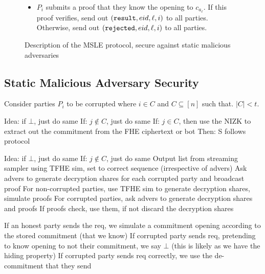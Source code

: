 \begin{figure}
{\begin{minipage}{1\textwidth}
\begin{itemize}
\begin{itemize}
					      \item $P_i$ submits a proof that they know the opening to $c_{a_\ell}$.
					            If this proof verifies, send out $(\texttt{result}, {eid}, \ell, i)$ to all parties.
					            Otherwise, send out $(\texttt{rejected}, {eid}, \ell, i)$ to all parties.
				      \end{itemize}
			\end{itemize}
		\end{minipage}
	}
	\caption{Description of the MSLE protocol, secure against static malicious adversaries}
	\label{fig:protocolStatisMalMSLE}
\end{figure}

\subsection{Static Malicious Adversary Security}
Consider parties $P_i$ to be corrupted where $i \in C$ and $C \subseteq [n]$ such that.
$|C| < t$.

\begin{lemma}
	Idea: if $\bot$, just do same	
	If: $j \notin C$, just do same
	If: $j \in C$, then use the NIZK to extract out the commitment from the FHE ciphertext or bot
	Then: S follows protocol
\end{lemma}

\begin{lemma}
	Idea: if $\bot$, just do same	
	If: $j \notin C$, just do same
	Output list from streaming sampler using TFHE sim, set to correct sequence (irrespective of advers)
	Ask advers to generate decryption shares for each corrupted party and broadcast proof
	For non-corrupted parties, use TFHE sim to generate decryption shares, simulate proofs
	For corrupted parties, ask advers to generate decryption shares and proofs
	If proofs check, use them, if not discard the decryption shares
\end{lemma}

\begin{lemma}
	If an honest party sends the req, we simulate a commitment opening according to the stored commitment (that we know)
	If corrupted party sends req, pretending to know opening to not their commitment, we say $\bot$ (this is likely as we have the hiding property)
	If corrupted party sends req correctly, we use the de-commitment that they send

\end{lemma}


